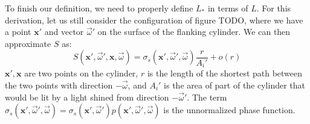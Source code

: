 To finish our definition, we need to properly define $L_*$ in terms of $L$. For this derivation, let us still consider the configuration of figure TODO, where we have a point $\mathbf{x}'$ and vector $\vec{\omega}'$ on the surface of the flanking cylinder. We can then approximate $S$ as:
$$
S(\mathbf{x}', \vec{\omega}', \mathbf{x}, \vec{\omega}) = \sigma_s(\mathbf{x}', \vec{\omega}', \vec{\omega}) \frac{r}{A_i'} + o(r)
$$
$\mathbf{x}', \mathbf{x}$ are two points on the cylinder, $r$ is the length of the shortest path between the two points with direction $-\vec{\omega}$, and $A_i'$ is the area of part of the cylinder that would be lit by a light shined from direction $-\vec{\omega}'$. The term $\sigma_s(\mathbf{x}', \vec{\omega}', \vec{\omega}) = \sigma_s(\mathbf{x}', \vec{\omega}') p(\mathbf{x}', \vec{\omega}', \vec{\omega})$ is the unnormalized phase function.

